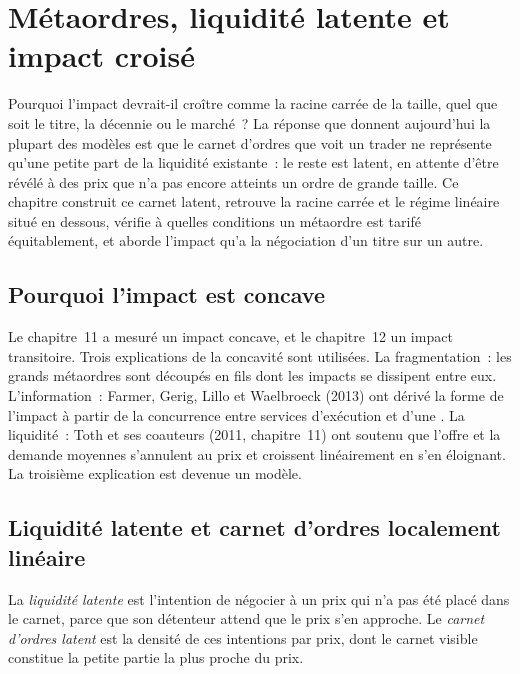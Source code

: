 \chapter{Métaordres, liquidité latente et impact croisé}\label{ch:mx:metaorders-latent-liquidity-and-cross-impact}

Pourquoi l'impact devrait-il croître comme la racine carrée de la taille, quel que soit le titre, la décennie ou le marché~? La réponse que donnent aujourd'hui la plupart des modèles est que le carnet d'ordres
que voit un trader ne représente qu'une petite part de la liquidité existante~: le reste est latent, en attente d'être révélé à des prix que n'a pas encore atteints un ordre de grande taille. Ce
chapitre construit ce carnet latent, retrouve la racine carrée et le régime linéaire situé en dessous, vérifie à quelles conditions un métaordre est tarifé équitablement, et aborde
l'impact qu'a la négociation d'un titre sur un autre.

\section{Pourquoi l'impact est concave}

Le chapitre~11 a mesuré un impact concave, et le chapitre~12 un impact transitoire. Trois explications de la concavité sont utilisées. La fragmentation~: les grands métaordres sont découpés
en fils dont les impacts se dissipent entre eux. L'information~: Farmer, Gerig, Lillo et Waelbroeck (2013) ont dérivé la forme de l'impact à partir de la concurrence entre
services d'exécution et d'une . La liquidité~: Toth et ses coauteurs (2011, chapitre~11) ont soutenu que l'offre et la demande moyennes s'annulent au
prix et croissent linéairement en s'en éloignant. La troisième explication est devenue un modèle.

\section{Liquidité latente et carnet d'ordres localement linéaire}

\begin{definition}\label{def:mx:metaorders-latent-liquidity-and-cross-impact:latent}
La \emph{liquidité latente} est l'intention de négocier à un prix qui n'a pas été placé dans le carnet, parce que son détenteur attend
que le prix s'en approche. Le \emph{carnet d'ordres latent} est la densité de ces intentions par prix, dont le carnet visible
constitue la petite partie la plus proche du prix.
\end{definition}

